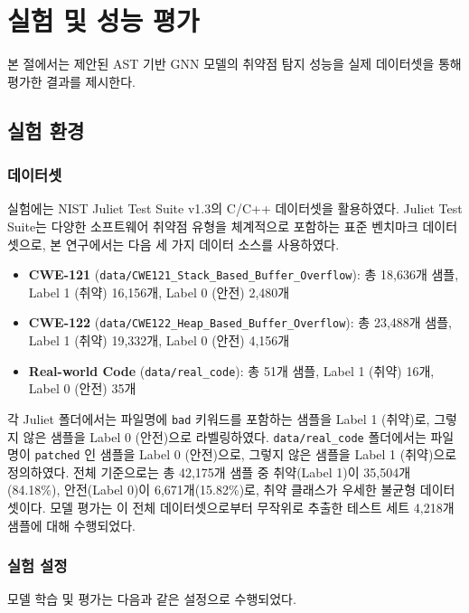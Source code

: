\clearpage

\section{실험 및 성능 평가}

본 절에서는 제안된 AST 기반 GNN 모델의 취약점 탐지 성능을 실제 데이터셋을 통해 평가한 결과를 제시한다.

\subsection{실험 환경}

\subsubsection{데이터셋}
실험에는 NIST Juliet Test Suite v1.3의 C/C++ 데이터셋을 활용하였다. Juliet Test Suite는 다양한 소프트웨어 취약점 유형을 체계적으로 포함하는 표준 벤치마크 데이터셋으로, 본 연구에서는 다음 세 가지 데이터 소스를 사용하였다.

\begin{itemize}
    \item \textbf{CWE-121} (\texttt{data/CWE121\_Stack\_Based\_Buffer\_Overflow}): 총 18,636개 샘플, Label 1 (취약) 16,156개, Label 0 (안전) 2,480개
    \item \textbf{CWE-122} (\texttt{data/CWE122\_Heap\_Based\_Buffer\_Overflow}): 총 23,488개 샘플, Label 1 (취약) 19,332개, Label 0 (안전) 4,156개
    \item \textbf{Real-world Code} (\texttt{data/real\_code}): 총 51개 샘플, Label 1 (취약) 16개, Label 0 (안전) 35개
\end{itemize}

각 Juliet 폴더에서는 파일명에 \texttt{bad} 키워드를 포함하는 샘플을 Label 1 (취약)로, 그렇지 않은 샘플을 Label 0 (안전)으로 라벨링하였다. \texttt{data/real\_code} 폴더에서는 파일명이 \texttt{patched} 인 샘플을 Label 0 (안전)으로, 그렇지 않은 샘플을 Label 1 (취약)으로 정의하였다. 전체 기준으로는 총 42,175개 샘플 중 취약(Label 1)이 35,504개(84.18\%), 안전(Label 0)이 6,671개(15.82\%)로, 취약 클래스가 우세한 불균형 데이터셋이다. 모델 평가는 이 전체 데이터셋으로부터 무작위로 추출한 테스트 세트 4,218개 샘플에 대해 수행되었다.

\subsubsection{실험 설정}
모델 학습 및 평가는 다음과 같은 설정으로 수행되었다.

